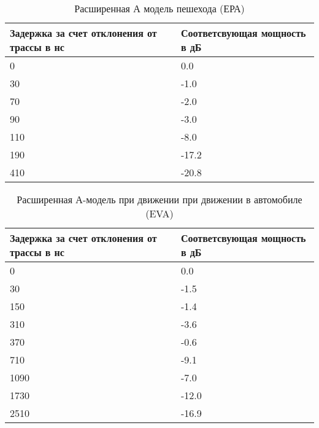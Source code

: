 \begin{table} [htb]
  \centering
\parbox{15cm}{\caption{Расширенная А модель пешехода (ЕРА) \cite{TS36104}}\label{EPA}}
\begin{tabular}{|l|l|}
    \hline
    \hline
    Задержка за счет отклонения от трассы в нс &  Соответсвующая мощность в дБ \\ \hline \hline
    0                                     & 0.0                           \\ \hline
    30                                    & -1.0                          \\ \hline
    70                                    & -2.0                          \\ \hline
    90                                    & -3.0                          \\ \hline
    110                                   & -8.0                          \\ \hline
    190                                   & -17.2                         \\ \hline
    410                                   & -20.8                         \\ \hline
    \end{tabular}

\end{table}

\begin{table} [htb]
  \centering
\parbox{15cm}{\caption{Расширенная А-модель при движении при движении в автомобиле (EVA) \cite{TS36104}}\label{EVA}}
\begin{tabular}{|l|l|}
    \hline
    \hline
    Задержка за счет отклонения от трассы в нс &  Соответсвующая мощность в дБ \\ \hline \hline
    0                                          & 0.0                           \\ \hline
    30                                         & -1.5                          \\ \hline
    150                                        & -1.4                          \\ \hline
    310                                        & -3.6                          \\ \hline
    370                                        & -0.6                          \\ \hline
    710                                        & -9.1                          \\ \hline
    1090                                       & -7.0                          \\ \hline
    1730                                       & -12.0                         \\ \hline
    2510                                       & -16.9                         \\ \hline
    \end{tabular}
\end{table}


